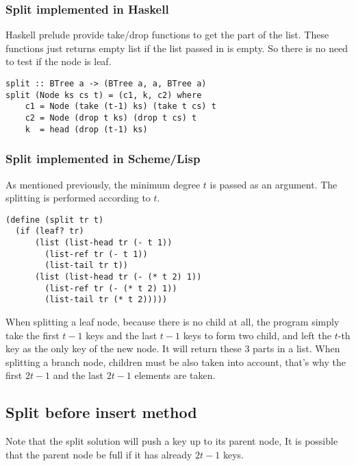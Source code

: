 \documentclass{article}
\begin{document}
\subsubsection*{Split implemented in Haskell}
Haskell prelude provide take/drop functions to get the part
of the list. These functions just returns empty list if the
list passed in is empty. So there is no need to test if
the node is leaf.

\lstset{language=Haskell}
\begin{lstlisting}
split :: BTree a -> (BTree a, a, BTree a)
split (Node ks cs t) = (c1, k, c2) where
    c1 = Node (take (t-1) ks) (take t cs) t
    c2 = Node (drop t ks) (drop t cs) t
    k  = head (drop (t-1) ks)
\end{lstlisting}

\subsubsection*{Split implemented in Scheme/Lisp}
As mentioned previously, the minimum degree $t$ is passed as an argument.
The splitting is performed according to $t$.

\lstset{language=lisp}
\begin{lstlisting}
(define (split tr t)
  (if (leaf? tr)
      (list (list-head tr (- t 1))
	    (list-ref tr (- t 1))
	    (list-tail tr t))
      (list (list-head tr (- (* t 2) 1))
	    (list-ref tr (- (* t 2) 1))
	    (list-tail tr (* t 2)))))
\end{lstlisting}

When splitting a leaf node, because there is no child at all, the
program simply take the first $t-1$ keys and the last $t-1$ keys
to form two child, and left the $t$-th key as the only key of the
new node. It will return these 3 parts in a list. When splitting
a branch node, children must be also taken into account, that's
why the first $2t-1$ and the last $2t-1$ elements are taken.

\subsection{Split before insert method}
\label{split before insertion}

Note that the split solution will push a key up to its parent node,
It is possible that the parent node be full if it has already
$2t-1$ keys.
\end{document}
